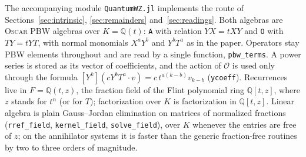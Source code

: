 \documentclass[11pt,a4paper]{article}
\newcommand{\Q}{\mathbb Q}
\newcommand{\Op}{\mathcal O}
\theoremstyle{plain}
\theoremstyle{definition}
\theoremstyle{remark}
\begin{document}
The accompanying module \texttt{QuantumWZ.jl} implements the route of
Sections~\ref{sec:intrinsic}, \ref{sec:remainders} and~\ref{sec:readings}. Both algebras are
\textsc{Oscar} PBW algebras \cite{OscarPBW} over $K=\Q(t)$: \texttt{A} with
relation $YX=tXY$ and \texttt{O} with $TY=tYT$, with normal monomials $X^aY^b$
and $Y^bT^a$ as in the paper. Operators stay PBW elements throughout and are read
by a single function, \texttt{pbw\_terms}. A power series is stored as its
vector of coefficients, and the action of $\Op$ is used only through the formula
$[Y^k](cY^bT^a\cdot v)=c\,t^{a(k-b)}v_{k-b}$ (\texttt{ycoeff}). Recurrences live
in $F=\Q(t,z)$, the fraction field of the Flint polynomial ring $\Q[t,z]$, where
$z$ stands for $t^n$ (or for $T$); factorization over $K$ is factorization in
$\Q[t,z]$. Linear algebra is plain Gauss--Jordan elimination on matrices of
normalized fractions (\texttt{rref\_field}, \texttt{kernel\_field},
\texttt{solve\_field}), over $K$ whenever the entries are free of $z$; on the
annihilator systems it is faster than the generic fraction-free routines by two
to three orders of magnitude.
\end{document}

